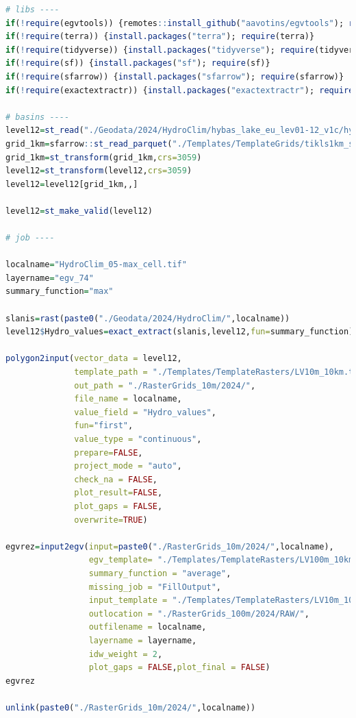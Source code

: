 \documentclass[
]{book}
\begin{document}
\begin{lstlisting}[language=R]
# libs ----
if(!require(egvtools)) {remotes::install_github("aavotins/egvtools"); require(egvtools)}
if(!require(terra)) {install.packages("terra"); require(terra)}
if(!require(tidyverse)) {install.packages("tidyverse"); require(tidyverse)}
if(!require(sf)) {install.packages("sf"); require(sf)}
if(!require(sfarrow)) {install.packages("sfarrow"); require(sfarrow)}
if(!require(exactextractr)) {install.packages("exactextractr"); require(exactextractr)}

# basins ----
level12=st_read("./Geodata/2024/HydroClim/hybas_lake_eu_lev01-12_v1c/hybas_lake_eu_lev12_v1c.shp")
grid_1km=sfarrow::st_read_parquet("./Templates/TemplateGrids/tikls1km_sauzeme.parquet")
grid_1km=st_transform(grid_1km,crs=3059)
level12=st_transform(level12,crs=3059)
level12=level12[grid_1km,,]

level12=st_make_valid(level12)

# job ----

localname="HydroClim_05-max_cell.tif"
layername="egv_74"
summary_function="max"
  
slanis=rast(paste0("./Geodata/2024/HydroClim/",localname))
level12$Hydro_values=exact_extract(slanis,level12,fun=summary_function)
  
polygon2input(vector_data = level12,
              template_path = "./Templates/TemplateRasters/LV10m_10km.tif",
              out_path = "./RasterGrids_10m/2024/",
              file_name = localname,
              value_field = "Hydro_values",
              fun="first",
              value_type = "continuous",
              prepare=FALSE,
              project_mode = "auto",
              check_na = FALSE,
              plot_result=FALSE,
              plot_gaps = FALSE,
              overwrite=TRUE)
  
egvrez=input2egv(input=paste0("./RasterGrids_10m/2024/",localname),
                 egv_template= "./Templates/TemplateRasters/LV100m_10km.tif",
                 summary_function = "average",
                 missing_job = "FillOutput",
                 input_template = "./Templates/TemplateRasters/LV10m_10km.tif",
                 outlocation = "./RasterGrids_100m/2024/RAW/",
                 outfilename = localname,
                 layername = layername,
                 idw_weight = 2,
                 plot_gaps = FALSE,plot_final = FALSE)
egvrez
  
unlink(paste0("./RasterGrids_10m/2024/",localname))
\end{lstlisting}
\end{document}
